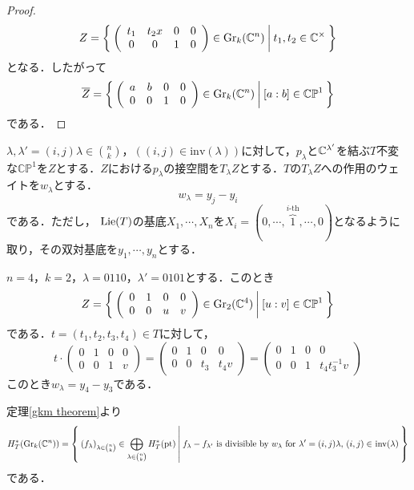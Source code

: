 \begin{proof}
  \[
  Z=\left\{\:\left(\begin{array}{cccc}
    t_1 & t_2x & 0 & 0 \\
    0 & 0 & 1 & 0 
  \end{array}\right)\in\text{Gr}_k(\mathbb{C}^n)\:\middle|\:t_1,t_2\in\mathbb{C}^\times\:\right\}
  \]
  となる．したがって
  \[
  \overline{Z} = \left\{\:\left(\begin{array}{cccc}
    a & b & 0 & 0 \\
    0 & 0 & 1 & 0
  \end{array}\right)\in\text{Gr}_k(\mathbb{C}^n)\:\middle|\:[a:b]\in\mathbb{CP}^1\:\right\}
  \]
  である．
\end{proof}

$\lambda,\lambda'=(i,j)\lambda\in\binom{n}{k}$，$((i,j)\in\text{inv}(\lambda))$に対して，$p_\lambda$と$\mathbb{C}^{\lambda'}$を結ぶ$T$不変な$\mathbb{CP}^1$を$Z$とする．$Z$における$p_\lambda$の接空間を$T_\lambda Z$とする．$T$の$T_\lambda Z$への作用のウェイトを$w_\lambda$とする．
\[
w_\lambda = y_j-y_i
\]
である．ただし，  $\text{Lie} (T)$の基底$X_1,\cdots,X_n$を$X_i=(0,\cdots,\overbrace{1}^{i\text{-th}},\cdots,0)$となるように取り，その双対基底を$y_1,\cdots,y_n$とする．

\begin{eg}
  $n=4$，$k=2$，$\lambda=0110$，$\lambda'=0101$とする．このとき
  \[
  Z=\left\{\:
    \left(\begin{array}{cccc}
      0 & 1 & 0 & 0\\
      0 & 0 & u & v
    \end{array}\right)\in\text{Gr}_2(\mathbb{C}^4)
  \:\middle|\:[u:v]\in\mathbb{CP}^1\:\right\}
  \]
  である．$t=(t_1,t_2,t_3,t_4)\in T$に対して，
  \[
  t\cdot\left(\begin{array}{cccc}
    0 & 1 & 0 & 0\\
    0 & 0 & 1 & v
  \end{array}\right)=\left(\begin{array}{cccc}
    0 & 1 & 0 & 0\\
    0 & 0 & t_3 & t_4v
  \end{array}\right)=\left(\begin{array}{cccc}
    0 & 1 & 0 & 0\\
    0 & 0 & 1 & t_4t_3^{-1}v
  \end{array}\right)
  \]
  このとき$w_\lambda=y_4-y_3$である．
\end{eg}


定理\ref{gkm theorem}より
\[
H^*_T(\text{Gr}_k(\mathbb{C}^n))=\left\{\:(f_\lambda)_{\lambda\in\binom{n}{k}}\in\bigoplus_{\lambda\in\binom{n}{k}}H^*_T(\text{pt})\:\middle|\:f_\lambda-f_{\lambda'}\text{ is divisible by $w_\lambda$ for $\lambda' = (i,j)\lambda$, $(i,j)\in$ inv$(\lambda)$}\:\right\}
\]
である．

